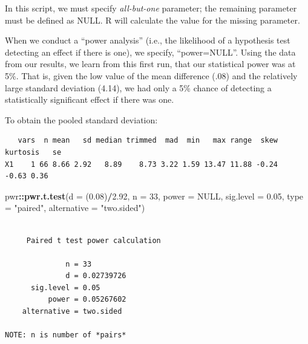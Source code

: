 \documentclass[
  11pt,
]{book}
\newenvironment{Shaded}{\begin{snugshade}}{\end{snugshade}}
\newcommand{\AttributeTok}[1]{\textcolor[rgb]{0.27,0.27,0.27}{#1}}
\newcommand{\ConstantTok}[1]{\textcolor[rgb]{0.37,0.37,0.37}{#1}}
\newcommand{\DecValTok}[1]{\textcolor[rgb]{0.06,0.06,0.06}{#1}}
\newcommand{\FloatTok}[1]{\textcolor[rgb]{0.06,0.06,0.06}{#1}}
\newcommand{\FunctionTok}[1]{\textcolor[rgb]{0.27,0.27,0.27}{\textbf{#1}}}
\newcommand{\NormalTok}[1]{#1}
\newcommand{\SpecialCharTok}[1]{\textcolor[rgb]{0.43,0.43,0.43}{\textbf{#1}}}
\newcommand{\StringTok}[1]{\textcolor[rgb]{0.5,0.5,0.5}{#1}}
\begin{document}
In this script, we must specify \emph{all-but-one} parameter; the remaining parameter must be defined as NULL. R will calculate the value for the missing parameter.

When we conduct a ``power analysis'' (i.e., the likelihood of a hypothesis test detecting an effect if there is one), we specify, ``power=NULL''. Using the data from our results, we learn from this first run, that our statistical power was at 5\%. That is, given the low value of the mean difference (.08) and the relatively large standard deviation (4.14), we had only a 5\% chance of detecting a statistically significant effect if there was one.

To obtain the pooled standard deviation:

\begin{Shaded}
\end{Shaded}

\begin{verbatim}
   vars  n mean   sd median trimmed  mad  min   max range  skew kurtosis   se
X1    1 66 8.66 2.92   8.89    8.73 3.22 1.59 13.47 11.88 -0.24    -0.63 0.36
\end{verbatim}

\begin{Shaded}
\begin{Highlighting}[]
\NormalTok{pwr}\SpecialCharTok{::}\FunctionTok{pwr.t.test}\NormalTok{(}\AttributeTok{d =}\NormalTok{ (}\FloatTok{0.08}\NormalTok{)}\SpecialCharTok{/}\FloatTok{2.92}\NormalTok{, }\AttributeTok{n =} \DecValTok{33}\NormalTok{, }\AttributeTok{power =} \ConstantTok{NULL}\NormalTok{, }\AttributeTok{sig.level =} \FloatTok{0.05}\NormalTok{,}
    \AttributeTok{type =} \StringTok{"paired"}\NormalTok{, }\AttributeTok{alternative =} \StringTok{"two.sided"}\NormalTok{)}
\end{Highlighting}
\end{Shaded}

\begin{verbatim}

     Paired t test power calculation 

              n = 33
              d = 0.02739726
      sig.level = 0.05
          power = 0.05267602
    alternative = two.sided

NOTE: n is number of *pairs*
\end{verbatim}
\end{document}
